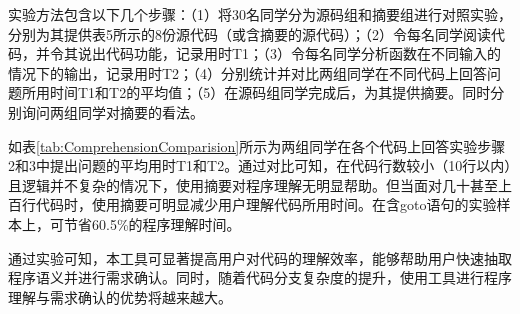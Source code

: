 实验方法包含以下几个步骤：（1）将30名同学分为源码组和摘要组进行对照实验，分别为其提供表5所示的8份源代码（或含摘要的源代码）；（2）令每名同学阅读代码，并令其说出代码功能，记录用时T1；（3）令每名同学分析函数在不同输入的情况下的输出，记录用时T2；（4）分别统计并对比两组同学在不同代码上回答问题所用时间T1和T2的平均值；（5）在源码组同学完成后，为其提供摘要。同时分别询问两组同学对摘要的看法。 

如表\ref{tab:ComprehensionComparision}所示为两组同学在各个代码上回答实验步骤2和3中提出问题的平均用时T1和T2。通过对比可知，在代码行数较小（10行以内）且逻辑并不复杂的情况下，使用摘要对程序理解无明显帮助。但当面对几十甚至上百行代码时，使用摘要可明显减少用户理解代码所用时间。在含goto语句的实验样本上，可节省60.5\%的程序理解时间。

通过实验可知，本工具可显著提高用户对代码的理解效率，能够帮助用户快速抽取程序语义并进行需求确认。同时，随着代码分支复杂度的提升，使用工具进行程序理解与需求确认的优势将越来越大。

